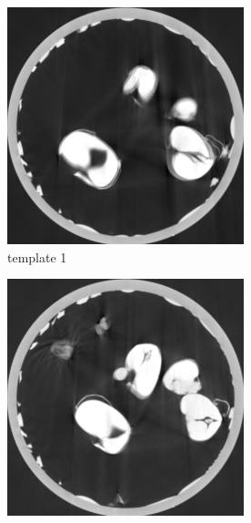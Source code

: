 \documentclass{article}
\begin{document}
\begin{figure}[h]
    \begin{subfigure}[b]{0.3\linewidth}
        \includegraphics[width=\textwidth]{../images/supplementary/2D_sprouts/template1.png}
        \caption{template 1}
    \end{subfigure}
    \begin{subfigure}[b]{0.3\linewidth}
        \includegraphics[width=\textwidth]{../images/supplementary/2D_sprouts/template2.png}

\end{subfigure}
\end{figure}
\end{document}
